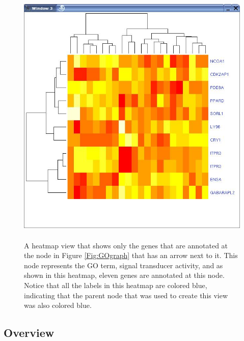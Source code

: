 \documentclass[11pt]{article}
\begin{document}
\begin{figure}[ht]
  \begin{center}
    \includegraphics[height=5in, width=5in]{heatmapsub.jpg}
    \caption{ A heatmap view that shows only the genes that are annotated at
      the node in Figure \ref{Fig:GOgraph} that has an arrow next to it.  This
      node represents the GO term, signal transducer activity, and as shown in
      this heatmap, eleven genes are annotated at this node.  Notice that all
      the labels in this heatmap are colored blue, indicating that the parent
      node that was used to create this view was also colored blue.  
     }
    \label{Fig:heatmapsub}
  \end{center}
\end{figure}


\subsection*{Overview}
\end{document}
